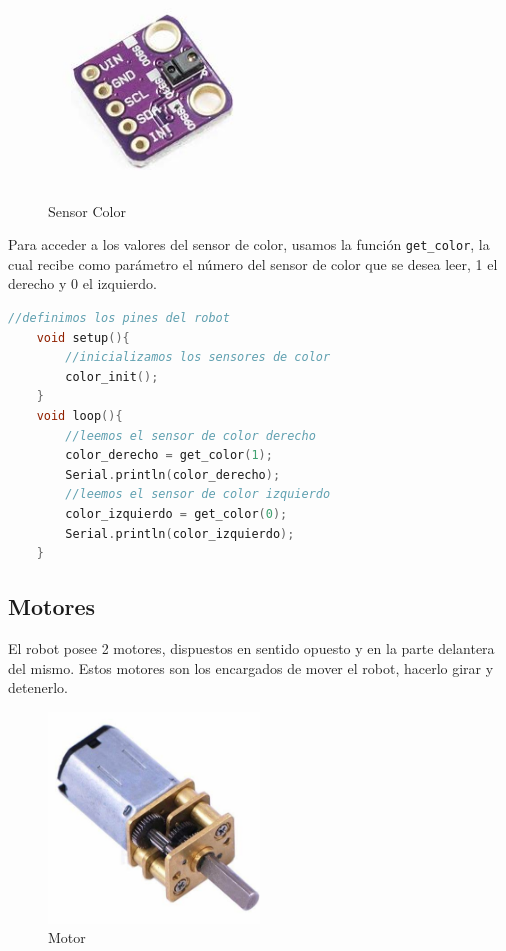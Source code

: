 \documentclass[12pt]{article}
\begin{document}
\begin{figure}[H]
    \centering
    \includegraphics[width=0.5\textwidth]{sensor_images/color.jpeg}
    \caption{Sensor Color}
    \label{fig:sensor_color}
\end{figure}

Para acceder a los valores del sensor de color, usamos la función \texttt{get\_color}, la cual recibe como parámetro el número del sensor de color que se desea leer,
1 el derecho y 0 el izquierdo.

\begin{lstlisting}[language=C++, basicstyle=\color{codecolor}]
    //definimos los pines del robot
    void setup(){
        //inicializamos los sensores de color
        color_init();
    }
    void loop(){
        //leemos el sensor de color derecho
        color_derecho = get_color(1);
        Serial.println(color_derecho);
        //leemos el sensor de color izquierdo
        color_izquierdo = get_color(0);
        Serial.println(color_izquierdo);
    }
\end{lstlisting}

\subsection*{\textcolor{subtitlecolor}{Motores}}
El robot posee 2 motores, dispuestos en sentido opuesto y en la parte delantera del mismo. Estos motores son los encargados de mover el robot, hacerlo girar
y detenerlo.

\begin{figure}[H]
    \centering
    \includegraphics[width=0.5\textwidth]{actuador_images/motor.jpeg}
    \caption{Motor}
    \label{fig:motor}
\end{figure}
\end{document}
